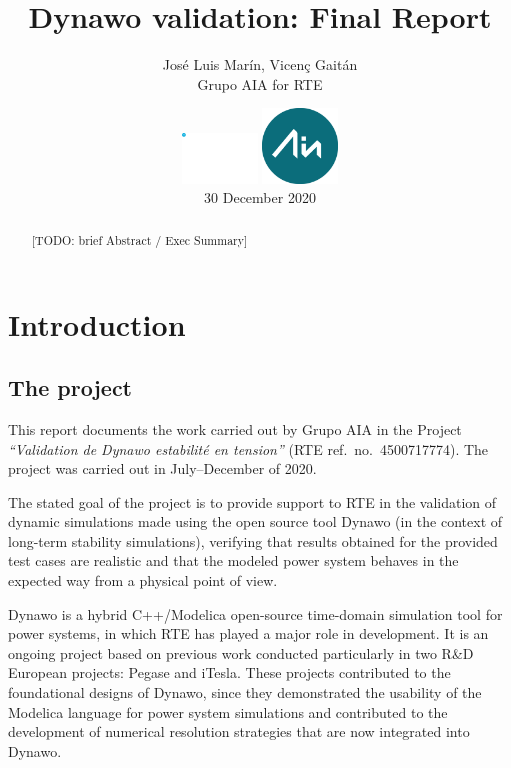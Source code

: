 \documentclass[11pt, a4paper, twoside, titlepage]{article}
\title{Dynawo validation: Final Report}
\author{José Luis Marín, Vicenç Gaitán \\
	Grupo AIA for RTE}
\date{
  \vspace{2cm}
  \includegraphics[width=2cm]{logos/Logo_RTE.pdf}
  \includegraphics[width=2cm]{logos/Logo-pequeno.png}\\
  \vspace{1cm}
  30 December 2020
}
\begin{document}
\hypersetup{pageanchor=false}
\begin{titlepage}
  \maketitle
\end{titlepage}
\hypersetup{pageanchor=true}

\begin{abstract}
  [TODO: brief Abstract / Exec Summary]
\end{abstract}

\tableofcontents



\section{Introduction}

\subsection{The project}
This report documents the work carried out by Grupo AIA in the Project
\emph{``Validation de Dynawo estabilité en tension''} (RTE
ref.\ no.\ 4500717774). The project was carried out in July--December
of 2020.

The stated goal of the project is to provide support to RTE in the
validation of dynamic simulations made using the open source tool
Dynawo (in the context of long-term stability simulations), verifying
that results obtained for the provided test cases are realistic and
that the modeled power system behaves in the expected way from a
physical point of view.

Dynawo is a hybrid C++/Modelica open-source time-domain simulation
tool for power systems, in which RTE has played a major role in
development. It is an ongoing project based on previous work conducted
particularly in two R\&D European projects: Pegase and iTesla.  These
projects contributed to the foundational designs of Dynawo, since they
demonstrated the usability of the Modelica language for power system
simulations and contributed to the development of numerical resolution
strategies that are now integrated into Dynawo.
\end{document}
